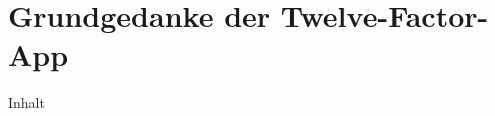 \section{Grundgedanke der Twelve-Factor-App}
\label{sec:03-05_basic-idea-of-twelve-factor-app}

Inhalt
